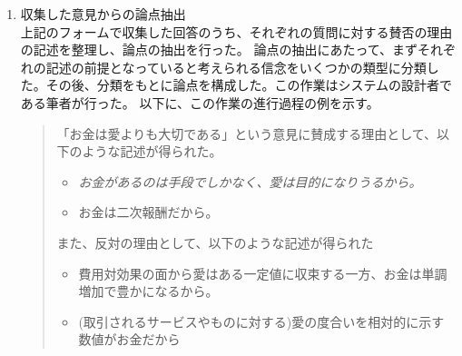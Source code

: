 \documentclass[11pt, a4paper]{jreport} %
\begin{document}
\begin{enumerate}

\item 収集した意見からの論点抽出\\
上記のフォームで収集した回答のうち、それぞれの質問に対する賛否の理由の記述を整理し、論点の抽出を行った。
論点の抽出にあたって、まずそれぞれの記述の前提となっていると考えられる信念をいくつかの類型に分類した。その後、分類をもとに論点を構成した。この作業はシステムの設計者である筆者が行った。
以下に、この作業の進行過程の例を示す。
\begin{quote}
「お金は愛よりも大切である」という意見に賛成する理由として、以下のような記述が得られた。
\begin{itemize}
\item \textsl{お金があるのは手段でしかなく、愛は目的になりうるから。}
\item お金は二次報酬だから。
\end{itemize}
また、反対の理由として、以下のような記述が得られた
\begin{itemize}
\item 費用対効果の面から愛はある一定値に収束する一方、お金は単調増加で豊かになるから。
\item (取引されるサービスやものに対する)愛の度合いを相対的に示す数値がお金だから
\end{itemize}



\end{quote}
\end{enumerate}
\end{document}
